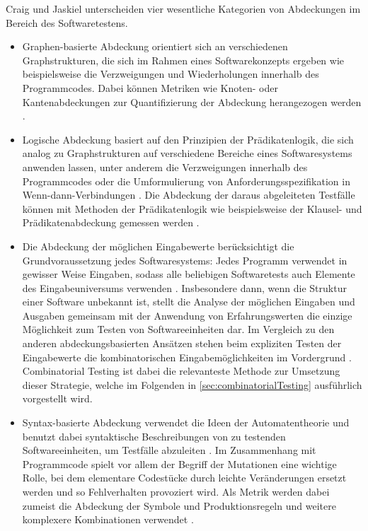 
Craig und Jaskiel \cite{craig2002systematic} unterscheiden vier wesentliche Kategorien von Abdeckungen im Bereich des Softwaretestens. 
\begin{itemize}
\item Graphen-basierte Abdeckung orientiert sich an verschiedenen Graphstrukturen, die sich im Rahmen eines Softwarekonzepts ergeben wie beispielsweise die Verzweigungen und Wiederholungen innerhalb des Programmcodes. Dabei können Metriken wie Knoten- oder Kantenabdeckungen zur Quantifizierung der Abdeckung herangezogen werden \cite[S. 27 ff.]{craig2002systematic}.
\item Logische Abdeckung basiert auf den Prinzipien der Prädikatenlogik, die sich analog zu Graphstrukturen auf verschiedene Bereiche eines Softwaresystems anwenden lassen, unter anderem die Verzweigungen innerhalb des Programmcodes oder die Umformulierung von Anforderungsspezifikation in Wenn-dann-Verbindungen \cite[S. 131 ff.]{craig2002systematic}. Die Abdeckung der daraus abgeleiteten Testfälle können mit Methoden der Prädikatenlogik wie beispielsweise der Klausel- und Prädikatenabdeckung gemessen werden \cite[S. 106 ff.]{craig2002systematic}.
\item Die Abdeckung der möglichen Eingabewerte berücksichtigt die Grundvoraussetzung jedes Softwaresystems: Jedes Programm verwendet in gewisser Weise Eingaben, sodass alle beliebigen Softwaretests auch Elemente des Eingabeuniversums verwenden \cite[S. 150]{craig2002systematic}. Insbesondere dann, wenn die Struktur einer Software unbekannt ist, stellt die Analyse der möglichen Eingaben und Ausgaben gemeinsam mit der Anwendung von Erfahrungswerten die einzige Möglichkeit zum Testen von Softwareeinheiten dar. Im Vergleich zu den anderen abdeckungsbasierten Ansätzen stehen beim expliziten Testen der Eingabewerte die kombinatorischen Eingabemöglichkeiten im Vordergrund \cite[S. 150 ff.]{craig2002systematic}. Combinatorial Testing ist dabei die relevanteste Methode zur Umsetzung dieser Strategie, welche im Folgenden in \autoref{sec:combinatorialTesting} ausführlich vorgestellt wird. 
\item Syntax-basierte Abdeckung verwendet die Ideen der Automatentheorie und benutzt dabei syntaktische Beschreibungen von zu testenden Softwareeinheiten, um Testfälle abzuleiten \cite[S. 170 ff.]{craig2002systematic}. Im Zusammenhang mit Programmcode spielt vor allem der Begriff der Mutationen eine wichtige Rolle, bei dem elementare Codestücke durch leichte Veränderungen ersetzt werden und so Fehlverhalten provoziert wird. Als Metrik werden dabei zumeist die Abdeckung der Symbole und Produktionsregeln und weitere komplexere Kombinationen verwendet \cite[S. 172]{craig2002systematic}.
\end{itemize}

